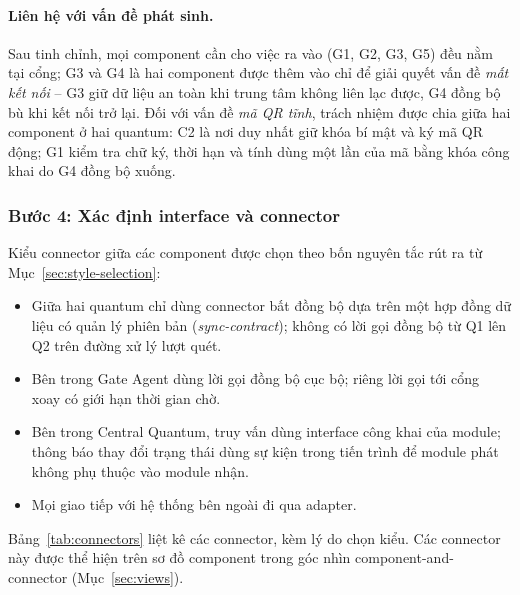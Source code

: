 \paragraph{Liên hệ với vấn đề phát sinh.} Sau tinh chỉnh, mọi component cần cho việc ra vào (G1, G2, G3, G5) đều nằm tại cổng; G3 và G4 là hai component được thêm vào chỉ để giải quyết vấn đề \textit{mất kết nối} -- G3 giữ dữ liệu an toàn khi trung tâm không liên lạc được, G4 đồng bộ bù khi kết nối trở lại. Đối với vấn đề \textit{mã QR tĩnh}, trách nhiệm được chia giữa hai component ở hai quantum: C2 là nơi duy nhất giữ khóa bí mật và ký mã QR động; G1 kiểm tra chữ ký, thời hạn và tính dùng một lần của mã bằng khóa công khai do G4 đồng bộ xuống.

\subsubsection{Bước 4: Xác định interface và connector}\label{sec:logical-step4}
Kiểu connector giữa các component được chọn theo bốn nguyên tắc rút ra từ Mục~\ref{sec:style-selection}:
\begin{itemize}
    \item Giữa hai quantum chỉ dùng connector bất đồng bộ dựa trên một hợp đồng dữ liệu có quản lý phiên bản (\textit{sync-contract}); không có lời gọi đồng bộ từ Q1 lên Q2 trên đường xử lý lượt quét.
    \item Bên trong Gate Agent dùng lời gọi đồng bộ cục bộ; riêng lời gọi tới cổng xoay có giới hạn thời gian chờ.
    \item Bên trong Central Quantum, truy vấn dùng interface công khai của module; thông báo thay đổi trạng thái dùng sự kiện trong tiến trình để module phát không phụ thuộc vào module nhận.
    \item Mọi giao tiếp với hệ thống bên ngoài đi qua adapter.
\end{itemize}
Bảng~\ref{tab:connectors} liệt kê các connector, kèm lý do chọn kiểu. Các connector này được thể hiện trên sơ đồ component trong góc nhìn component-and-connector (Mục~\ref{sec:views}).

